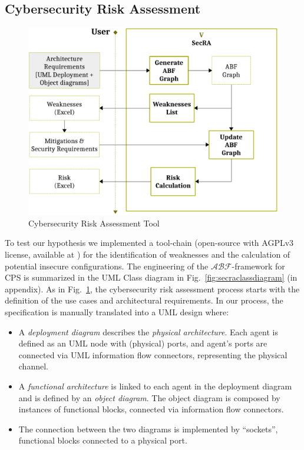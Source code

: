 \documentclass[runningheads]{llncs}
\newcommand{\assertionRegion}{\mathcal{A}}
\newcommand{\beliefRegion}{\mathcal{B}}
\newcommand{\factRegion}{\mathcal{F}}
\newcommand{\abftheory}{\assertionRegion\beliefRegion\factRegion}
\begin{document}
\subsection{Cybersecurity Risk Assessment}\label{sec:secra}
\begin{figure}[t]
	\centering
	\includegraphics[width=.5\columnwidth]{v-secra.pdf}
	\caption{Cybersecurity Risk Assessment Tool}
	\label{fig:secra}
\end{figure}
To test our hypothesis we implemented a tool-chain (open-source with
AGPLv3 license, available at \autocite{v-research2020cybersecurity}) for the
identification of weaknesses and the calculation of potential insecure
configurations. The engineering of the $\abftheory$-framework for CPS is summarized in the UML
Class diagram in Fig.~\ref{fig:secraclassdiagram} (in appendix). 
As in Fig.~\ref{fig:secra}, the cybersecurity risk assessment process
starts with the definition of the use cases and architectural requirements.  In our process, the specification is manually
translated into a UML design where:
\begin{itemize}
	\item A \emph{deployment diagram} describes the \emph{physical
		architecture}. Each agent is defined as an UML node with (physical)
		ports, and agent's ports are connected via UML information flow
		connectors, representing the physical channel.
	\item A \emph{functional architecture} is linked to each agent in the
		deployment diagram and is defined by an \emph{object diagram}.
		The object diagram is composed by instances of functional
		blocks, connected via information flow connectors.
	\item The connection between the two diagrams is implemented by
		``sockets'', functional blocks connected to a 
		physical port.
\end{itemize}
\end{document}
